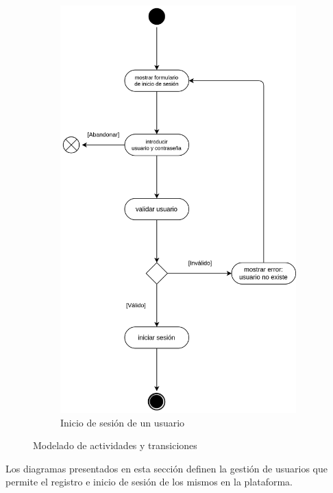 \begin{figure}[h]
\begin{subfigure}{0.45\textwidth}
                    \centering
                    \includegraphics[scale=0.15]{images/Diagramas/Actividades y transiciones 2.png}
                    \caption{Inicio de sesión de un usuario}
                    \label{fig:inicio-usuario}
                \end{subfigure}
                \caption{Modelado de actividades y transiciones}
                \label{fig:tratamiento-usuarios}
            \end{figure}
            
            Los diagramas presentados en esta sección definen la gestión de usuarios que permite el registro e inicio de sesión de los mismos en la plataforma.
            

